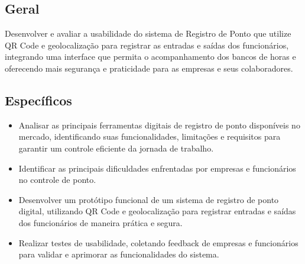\subsection{Geral}

Desenvolver e avaliar a usabilidade do sistema de Registro de Ponto que utilize QR Code e geolocalização para registrar as entradas e saídas dos funcionários, integrando uma interface que permita o acompanhamento dos bancos de horas e oferecendo mais segurança e praticidade para as empresas e seus colaboradores.

\subsection{Específicos}
\begin{itemize}
    \item Analisar as principais ferramentas digitais de registro de ponto disponíveis no mercado, identificando suas funcionalidades, limitações e requisitos para garantir um controle eficiente da jornada de trabalho.
    \item Identificar as principais dificuldades enfrentadas por empresas e funcionários no controle de ponto.
    \item Desenvolver um protótipo funcional de um sistema de registro de ponto digital, utilizando QR Code e geolocalização para registrar entradas e saídas dos funcionários de maneira prática e segura.
    \item Realizar testes de usabilidade, coletando feedback de empresas e funcionários para validar e aprimorar as funcionalidades do sistema.
\end{itemize}

